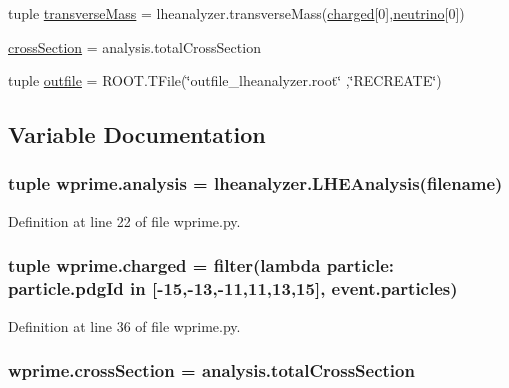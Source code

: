 \begin{DoxyCompactItemize}
\item 
tuple \hyperlink{namespacewprime_ab689ae92a992d53349486936abb75b2e}{transverse\-Mass} = lheanalyzer.\-transverse\-Mass(\hyperlink{namespacewprime_af629c79a2061f7dcdee447ba6ebe2a7d}{charged}\mbox{[}0\mbox{]},\hyperlink{namespacewprime_aa30022404f607643027f776a815f22e8}{neutrino}\mbox{[}0\mbox{]})
\item 
\hyperlink{namespacewprime_a8b4da92d3cc1e5113fa358ebbda61083}{cross\-Section} = analysis.\-total\-Cross\-Section
\item 
tuple \hyperlink{namespacewprime_abc2eda51ac0db27e451c75e1841c7c68}{outfile} = R\-O\-O\-T.\-T\-File(\char`\"{}outfile\-\_\-lheanalyzer.\-root\char`\"{} ,\char`\"{}R\-E\-C\-R\-E\-A\-T\-E\char`\"{})
\end{DoxyCompactItemize}


\subsection{Variable Documentation}
\subsubsection[{analysis}]{\setlength{\rightskip}{0pt plus 5cm}tuple wprime.\-analysis = {\bf lheanalyzer.\-L\-H\-E\-Analysis}(filename)}\label{namespacewprime_aaa589daa7007d01a1a492b22539b19c6}


Definition at line 22 of file wprime.\-py.

\subsubsection[{charged}]{\setlength{\rightskip}{0pt plus 5cm}tuple wprime.\-charged = filter(lambda particle\-: particle.\-pdg\-Id in \mbox{[}-\/15,-\/13,-\/11,11,13,15\mbox{]}, event.\-particles)}\label{namespacewprime_af629c79a2061f7dcdee447ba6ebe2a7d}


Definition at line 36 of file wprime.\-py.

\subsubsection[{cross\-Section}]{\setlength{\rightskip}{0pt plus 5cm}wprime.\-cross\-Section = analysis.\-total\-Cross\-Section}\label{namespacewprime_a8b4da92d3cc1e5113fa358ebbda61083}


